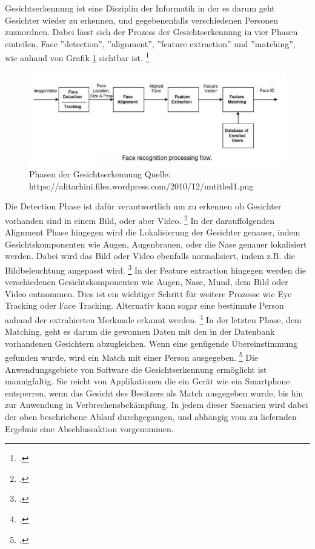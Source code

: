 \documentclass[12pt, a4paper]{scrbook}
\begin{document}
Gesichtserkennung ist eine Disziplin der Informatik in der es darum geht Gesichter wieder zu erkennen, und gegebenenfalls verschiedenen Personen zuzuordnen. Dabei lässt sich der Prozess der
Gesichtserkennung in vier Phasen einteilen, Face ''detection'', ''alignment'', ''feature extraction'' und ''matching'', wie anhand von Grafik \ref{fig:Face Recognition} sichtbar ist.
\footcite[Vgl. ][2]{HandbookFaceRec}
\begin{figure}[h]
\includegraphics[width=\linewidth]{Bilder/FaceRecognition.png}
\caption{ Phasen der Gesichtserkennung \newline Quelle: https://alitarhini.files.wordpress.com/2010/12/untitled1.png }
\label{fig:Face Recognition}
\end{figure}
Die Detection Phase ist dafür verantwortlich um zu erkennen ob Gesichter vorhanden sind in einem Bild, oder aber Video.
\footcite[Vgl. ][2]{HandbookFaceRec}
In der darauffolgenden Alignment Phase hingegen wird die Lokalisierung der Gesichter genauer, indem Gesichtskomponenten wie Augen, Augenbrauen, oder die Nase genauer lokalisiert werden. Dabei
wird das Bild oder Video ebenfalls normalisiert, indem z.B. die Bildbeleuchtung angepasst wird.
 \footcite[Vgl. ][2]{HandbookFaceRec}
In der Feature extraction hingegen werden die verschiedenen Gesichtskomponenten wie Augen, Nase, Mund, dem Bild oder Video entnommen. Dies ist ein wichtiger Schritt für weitere Prozesse wie
Eye Tracking oder Face Tracking. Alternativ kann sogar eine bestimmte Person anhand der extrahierten Merkmale erkannt werden.
\footcite[Vgl. ][Abstract]{IEEE}
In der letzten Phase, dem Matching, geht es darum die gewonnen Daten mit den in der Datenbank vorhandenen Gesichtern abzugleichen. Wenn eine genügende Übereinstimmung gefunden wurde, wird ein
Match mit einer Person ausgegeben.
  \footcite[Vgl. ][3]{HandbookFaceRec}
Die Anwendungsgebiete von Software die Gesichtserkennung ermöglicht ist mannigfaltig. Sie reicht von Applikationen die ein Gerät wie ein Smartphone entsperren, wenn das Gesicht des Besitzers als
Match ausgegeben wurde, bis hin zur Anwendung in Verbrechensbekämpfung. In jedem dieser Szenarien wird dabei der oben beschriebene Ablauf durchgegangen, und abhängig vom zu liefernden Ergebnis
eine Abschlussaktion vorgenommen.
\end{document}
